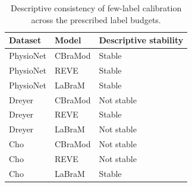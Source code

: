 \begin{longtable}{lll}
\caption{Descriptive consistency of few-label calibration across the prescribed label budgets.}\label{tab:cross_model_stability}\\
\toprule
Dataset & Model & Descriptive stability \\
\midrule
PhysioNet & CBraMod & Stable \\
PhysioNet & REVE & Stable \\
PhysioNet & LaBraM & Stable \\
Dreyer & CBraMod & Not stable \\
Dreyer & REVE & Stable \\
Dreyer & LaBraM & Not stable \\
Cho & CBraMod & Not stable \\
Cho & REVE & Not stable \\
Cho & LaBraM & Stable \\
\bottomrule
\end{longtable}
